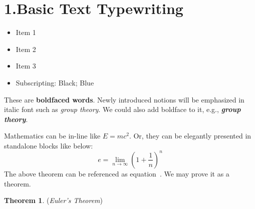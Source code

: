 \documentclass[11pt]{article}
\begin{document}
\mdxtitleblockstart{}

\mdxauthorstart{}

\mdxauthorend\mdtitleauthorrunning{}{}\mdxtitleblockend%

\section{1.\hspace*{0.5em}Basic Text Typewriting}\label{sec-basic-text-typewriting}%

\begin{itemize}[noitemsep,topsep=\mdcompacttopsep]%

\item{}Item 1%

\item{}Item 2%

\item{}Item 3%

\item{}Subscripting: Black; Blue%
\end{itemize}%

\noindent{}These are \textbf{boldfaced words}. Newly introduced notions will be emphasized in italic font such as \emph{group theory}. We could also add boldface to it, e.g., \textbf{\emph{group theory}}.%

Mathematics can be in-line like $E=mc^2$. Or, they can be elegantly presented in standalone blocks like below:%
\label{euler-thm}%
\noindent{}
\noindent\[%
  e = \lim_{n\rightarrow\infty} (1+\frac1n)^n
\]%
\noindent{}The above theorem can be referenced as equation~. We may prove it as a theorem.

\textbf{Theorem 1}. (\emph{Euler's Theorem})%
\end{document}
